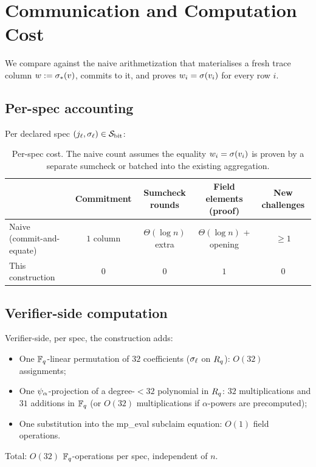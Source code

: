 \section{Communication and Computation Cost}
\label{sec:cost}

We compare  against the naive arithmetization that
materialises a fresh trace column $w := \sigma_*(v)$, commits to it,
and proves $w_i = \sigma(v_i)$ for every row $i$.

\subsection{Per-spec accounting}

Per declared spec $(j_\ell,\sigma_\ell) \in \mathcal{S}_{\mathrm{bit}}$:

\begin{table}[h]
\centering
\renewcommand{\arraystretch}{1.2}
\begin{tabular}{l c c c c}
\toprule
& Commitment & Sumcheck rounds & Field elements (proof) & New challenges \\
\midrule
Naive (commit-and-equate)
  & $1$ column
  & $\Theta(\log n)$ extra
  & $\Theta(\log n)$ + opening
  & $\ge 1$ \\
This construction
  & $0$
  & $0$
  & $1$
  & $0$ \\
\bottomrule
\end{tabular}
\caption{Per-spec cost. The naive count assumes the equality $w_i =
\sigma(v_i)$ is proven by a separate sumcheck or batched into the
existing aggregation.}
\end{table}

\subsection{Verifier-side computation}

Verifier-side, per spec, the construction adds:
\begin{itemize}[leftmargin=2em]
  \item One $\mathbb{F}_q$-linear permutation of $32$ coefficients
    ($\sigma_\ell$ on $R_q$): $O(32)$ assignments;
  \item One $\psi_{\alpha}$-projection of a degree-$<32$ polynomial in
    $R_q$: $32$ multiplications and $31$ additions in $\mathbb{F}_q$
    (or $O(32)$ multiplications if $\alpha$-powers are precomputed);
  \item One substitution into the mp\_eval subclaim equation: $O(1)$
    field operations.
\end{itemize}
Total: $O(32)$ $\mathbb{F}_q$-operations per spec, independent of $n$.

